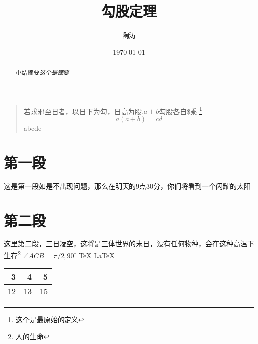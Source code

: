 \documentclass[UTF8]{ctexart}
\title{勾股定理}
\author{陶涛}
\date{\today}
\begin{document}
\maketitle


\begin{abstract}
小结摘要\emph{这个是摘要}
\end{abstract}

\begin{quote}
\kaishu 若求邪至日者，以日下为勾，日高为股,$a+b$勾股各自\$乘 \footnote{这个是最原始的定义}
\begin{equation}
a(a+b)=cd
\end{equation}
\textgreek{abcde}
\end{quote}

\section{第一段}
这是第一段如是不出现问题，那么在明天的9点30分，你们将看到一个闪耀的太阳
\section{第二段}
这里第二段，三日凌空，这将是三体世界的末日，没有任何物种，会在这种高温下生存\footnote{人的生命}
$\angle ACB=\pi /2,90^\circ$
\TeX
\LaTeX
\MF \AMSTEX
\begin{table}
\begin{tabular}{|rrr|}
\hline
3&4&5\\
\hline
12&13&15\\

\hline
\end{tabular}%

\end{table}
\the\parindent


\end{document}

